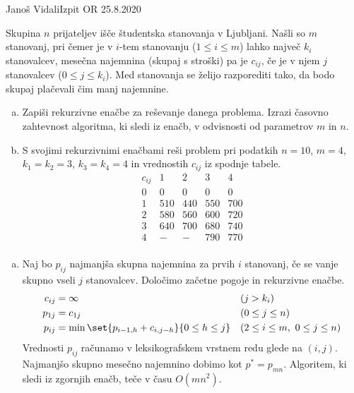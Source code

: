 \begin{naloga}{Janoš Vidali}{Izpit OR 25.8.2020}
\begin{vprasanje}
Skupina $n$ prijateljev išče študentska stanovanja v Ljubljani.
Našli so $m$ stanovanj,
pri čemer je v $i$-tem stanovanju ($1 \le i \le m$)
lahko največ $k_i$ stanovalcev,
mesečna najemnina (skupaj s stroški) pa je $c_{ij}$,
če je v njem $j$ stanovalcev ($0 \le j \le k_i$).
Med stanovanja se želijo razporediti tako,
da bodo skupaj plačevali čim manj najemnine.
\begin{enumerate}[(a)]
\item Zapiši rekurzivne enačbe za reševanje danega problema.
Izrazi časovno zahtevnost algoritma, ki sledi iz enačb,
v odvisnosti od parametrov $m$ in $n$.

\item S svojimi rekurzivnimi enačbami reši problem pri podatkih
$n = 10$, $m = 4$, $k_1 = k_2 = 3$, $k_3 = k_4 = 4$
in vrednostih $c_{ij}$ iz spodnje tabele.
$$
\begin{array}{c|cccc}
c_{ij} & 1 & 2 & 3 & 4 \\ \hline
0 &   0 &   0 &   0 &   0 \\
1 & 510 & 440 & 550 & 700 \\
2 & 580 & 560 & 600 & 720 \\
3 & 640 & 700 & 680 & 740 \\
4 &   - &   - & 790 & 770 \\
\end{array}
$$
\end{enumerate}
\end{vprasanje}

\begin{odgovor}
\begin{enumerate}[(a)]
\item Naj bo $p_{ij}$ najmanjša skupna najemnina za prvih $i$ stanovanj,
če se vanje skupno vseli $j$ stanovalcev.
Določimo začetne pogoje in rekurzivne enačbe.
\begin{align*}
c_{ij} &= \infty && (j > k_i) \\
p_{1j} &= c_{1j} && (0 \le j \le n) \\
p_{ij} &= \min\set{p_{i-1,h} + c_{i,j-h}}{0 \le h \le j}
&& (2 \le i \le m, \ 0 \le j \le n)
\end{align*}
Vrednosti $p_{ij}$ računamo v leksikografskem vrstnem redu glede na $(i, j)$.
Najmanjšo skupno mesečno najemnino dobimo kot $p^* = p_{mn}$.
Algoritem, ki sledi iz zgornjih enačb, teče v času $O(mn^2)$.


\end{enumerate}
\end{odgovor}
\end{naloga}
